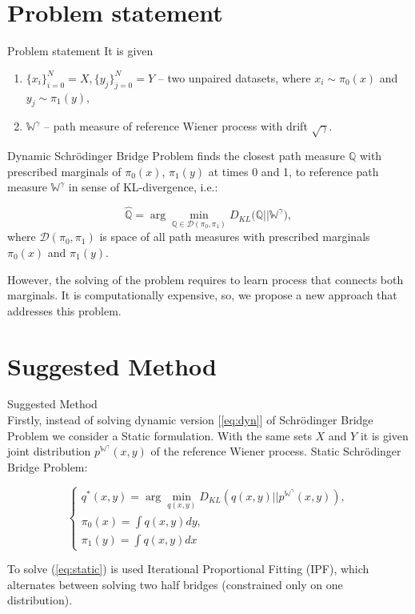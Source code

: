 \documentclass[10pt,pdf,hyperref={unicode}]{beamer}
\begin{document}
\section{Problem statement}
\begin{frame}{Problem statement}
It is given
\begin{enumerate}[1.]
    \item $\{x_i\}_{i=0}^N = X, \{y_j\}_{j=0}^N = Y$ -- two unpaired datasets,  where $x_i \sim \pi_0(x)$ and $y_j \sim \pi_1(y)$,
    \item $\mathbb{W}^{\gamma}$ -- path measure of reference Wiener process with drift $\sqrt{\gamma}$.
\end{enumerate}

Dynamic Schrödinger Bridge Problem finds the closest path measure $\mathbb{Q}$ with prescribed marginals of $\pi_0(x)$, $\pi_1(y)$ at times 0 and 1, to reference path measure $\mathbb{W}^{\gamma}$ in sense of KL-divergence, i.e.:

\begin{equation}
    \hat{\mathbb{Q}} = \arg\min_{\mathbb{Q}\in \mathcal{D}(\pi_0, \pi_1)} D_{KL}\mathbb{(Q||W}^\gamma),
    \label{eq:dyn}
\end{equation}
where $\mathcal{D}(\pi_0, \pi_1)$ is space of all path measures with prescribed marginals $\pi_0(x)$ and $\pi_1(y)$.

However, the solving of the problem requires to learn process that connects both marginals. It is computationally expensive, so, we propose a new approach that addresses this problem.

\end{frame}

\section{Suggested Method}
\begin{frame}{Suggested Method}
~\\[-1mm]
Firstly, instead of solving dynamic version [\ref{eq:dyn}] of Schrödinger Bridge Problem we consider a Static formulation. With the same sets $X$ and $Y$ it is given joint distribution $p^{\mathbb{W}^\gamma}(x, y)$ of the reference Wiener process. Static Schrödinger Bridge Problem:

\begin{equation}
    \left\{ \begin{array}{c}
    q^*(x,y) = \arg\min_{q(x,y)} D_{KL}(q(x,y)||p^{\mathbb{W}^\gamma}(x,y)), \\
    \pi_0(x) = \int q(x,y)dy, \\
    \pi_1(y) = \int q(x,y)dx
    \end{array}\right.
    \label{eq:static}
\end{equation}

To solve (\ref{eq:static}) is used Iterational Proportional Fitting (IPF), which alternates between solving two half bridges (constrained only on one distribution). 
\end{frame}
\end{document}
